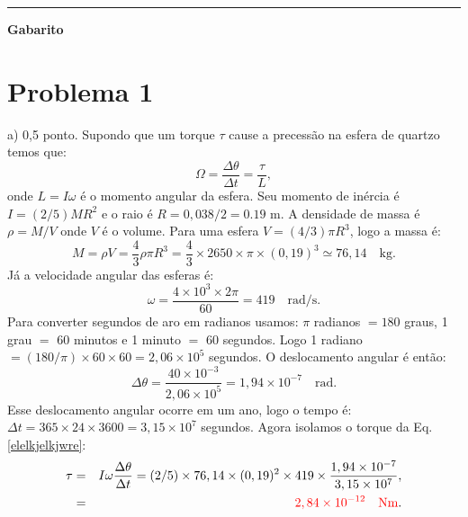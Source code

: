 \documentclass[a4paper, 11pt]{article}
\begin{document}
{\noindent\def\stackalignment{l}{\textcolor{cyan}{\rule{\linewidth}{2pt}}}\medskip}

%
\newpage
\begin{LARGE}
{\color{red}\textbf{Gabarito}}
\end{LARGE}


\section*{Problema 1}
{\color{red}a) 0,5 ponto.} Supondo que um torque $\tau$ cause a precessão na esfera de quartzo temos que:
\begin{equation}
\Omega = \dfrac{\Delta \theta }{\Delta t} = \dfrac{\tau}{L}, \label{elelkjelkjwre}
\end{equation}
onde $L=I\omega$ é o momento angular da esfera. Seu momento de inércia é $I=(2/5)MR^2$ e o raio é $R = 0,038/2 = 0.19$ m. A densidade de massa é $\rho = M/ V$ onde $V$ é o volume. Para uma esfera $V=(4/3)\pi R^3$, logo a massa é:
\begin{equation}
M = \rho V = \dfrac{4}{3} \rho \pi R^3 =\dfrac{4}{3} \times 2650 \times \pi \times (0,19)^3 \simeq 76,14 \quad \text{kg}. \nonumber
\end{equation}
Já a velocidade angular das esferas é:
\begin{equation}
\omega = \dfrac{4 \times 10^3 \times 2 \pi}{60} = 419 \quad \text{rad/s}. \nonumber
\end{equation}
Para converter segundos de aro em radianos usamos: $\pi$ radianos $= 180$ graus, 1 grau $=$ 60 minutos e 1 minuto $=$ 60 segundos. Logo 1 radiano $= (180/\pi) \times 60 \times 60  = 2,06 \times 10^5 $ segundos. O deslocamento angular é então: 
\begin{equation}
\Delta \theta = \dfrac{ 40 \times 10^{-3} }{2,06 \times 10^5} = 1,94 \times 10^{-7}\quad \text{rad}. \nonumber 
\end{equation}
Esse deslocamento angular ocorre em um ano, logo o tempo é: $\Delta t =365 \times 24 \times 3600 = 3,15 \times 10^7$ segundos. Agora isolamos o torque da Eq. \ref{elelkjelkjwre}:
\begin{eqnarray}
\tau &=& I \omega \dfrac{\Delta \theta}{\Delta t} = (2/5) \times 76,14 \times (0,19)^2 \times 419 \times \dfrac{1,94 \times 10^{-7}}{3,15 \times 10^7}, \nonumber \\
&=& {\color{red}2,84 \times 10^{-12} \quad \text{Nm}}. \nonumber 
\end{eqnarray}
\end{document}
